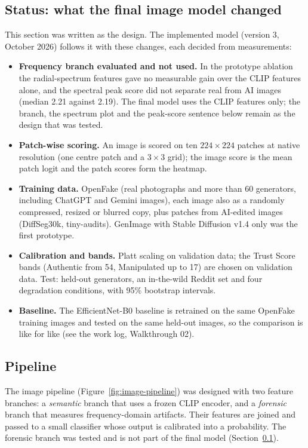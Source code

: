 \documentclass[11pt,a4paper]{article}
\begin{document}
\subsection{Status: what the final image model changed}
\label{sec:image-status}
This section was written as the design. The implemented model (version 3, October 2026) follows it with these
changes, each decided from measurements:
\begin{itemize}
  \item \textbf{Frequency branch evaluated and not used.} In the prototype ablation the radial-spectrum features gave no
        measurable gain over the CLIP features alone, and the spectral peak score did not separate real from AI
        images (median 2.21 against 2.19). The final model uses the CLIP features only; the branch, the spectrum plot and
        the peak-score sentence below remain as the design that was tested.
  \item \textbf{Patch-wise scoring.} An image is scored on ten $224{\times}224$ patches at native resolution (one centre patch and a
        $3{\times}3$ grid); the image score is the mean patch logit and the patch scores form the heatmap.
  \item \textbf{Training data.} OpenFake (real photographs and more than 60 generators, including ChatGPT and Gemini images),
        each image also as a randomly compressed, resized or blurred copy, plus patches from AI-edited images
        (DiffSeg30k, tiny-audits). GenImage with Stable Diffusion v1.4 only was the first prototype.
  \item \textbf{Calibration and bands.} Platt scaling on validation data; the Trust Score bands (Authentic from 54, Manipulated
        up to 17) are chosen on validation data. Test: held-out generators, an in-the-wild Reddit set and four degradation
        conditions, with 95\% bootstrap intervals.
  \item \textbf{Baseline.} The EfficientNet-B0 baseline is retrained on the same OpenFake training images and tested on the same
        held-out images, so the comparison is like for like (see the work log, Walkthrough 02).
\end{itemize}

\subsection{Pipeline}
The image pipeline (Figure~\ref{fig:image-pipeline}) was designed with two feature branches: a \emph{semantic}
branch that uses a frozen CLIP encoder, and a \emph{forensic} branch that measures
frequency-domain artifacts. Their features are joined and passed to a small classifier whose
output is calibrated into a probability. The forensic branch was tested and is not part of the final model
(Section~\ref{sec:image-status}).
\end{document}
